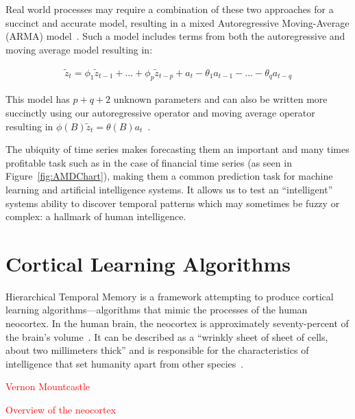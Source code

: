 \documentclass[oneside,12pt,openany]{book}
\begin{document}
	Real world processes may require a combination of these two approaches for a succinct and accurate model, resulting in a mixed Autoregressive Moving-Average (ARMA) model~\cite{Box}. Such a model includes terms from both the autoregressive and moving average model resulting in:
	
	\begin{align}
		\label{eqn:armamodel}
		\tilde{z}_{t}=\phi_{1} \tilde{z}_{t-1}+...+\phi_{p} \tilde{z}_{t-p}+a_{t}-\theta_{1}a_{t-1}-...-\theta_{q}a_{t-q}
	\end{align}
	
	\noindent This model has $p+q+2$ unknown parameters and can also be written more succinctly using our autoregressive operator and moving average operator resulting in $\phi(B)\tilde{z}_{t}=\theta(B)a_{t}$~\cite{Box}.
	
	The ubiquity of time series makes forecasting them an important and many times profitable task such as in the case of financial time series (as seen in Figure~\ref{fig:AMDChart}), making them a common prediction task for machine learning and artificial intelligence systems. It allows us to test an ``intelligent'' systems ability to discover temporal patterns which may sometimes be fuzzy or complex: a hallmark of human intelligence.
	
	
	
	
	
	
	
	\chapter{Cortical Learning Algorithms}
	
	Hierarchical Temporal Memory is a framework attempting to produce cortical learning algorithms---algorithms that mimic the processes of the human neocortex. In the human brain, the neocortex is approximately seventy-percent of the brain's volume~\cite{DiscoveriesBrainWorks}. It can be described as a ``wrinkly sheet of sheet of cells, about two millimeters thick'' and is responsible for the characteristics of intelligence that set humanity apart from other species~\cite{DiscoveriesBrainWorks}. 
	
	\textcolor{red}{Vernon Mountcastle}
	
	\textcolor{red}{Overview of the neocortex}
	
\end{document}
